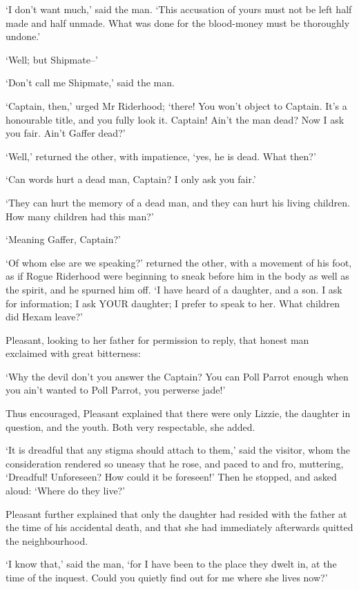 ‘I don’t want much,’ said the man. ‘This accusation of yours must not be
left half made and half unmade. What was done for the blood-money must
be thoroughly undone.’

‘Well; but Shipmate--’

‘Don’t call me Shipmate,’ said the man.

‘Captain, then,’ urged Mr Riderhood; ‘there! You won’t object to
Captain. It’s a honourable title, and you fully look it. Captain! Ain’t
the man dead? Now I ask you fair. Ain’t Gaffer dead?’

‘Well,’ returned the other, with impatience, ‘yes, he is dead. What
then?’

‘Can words hurt a dead man, Captain? I only ask you fair.’

‘They can hurt the memory of a dead man, and they can hurt his living
children. How many children had this man?’

‘Meaning Gaffer, Captain?’

‘Of whom else are we speaking?’ returned the other, with a movement of
his foot, as if Rogue Riderhood were beginning to sneak before him in
the body as well as the spirit, and he spurned him off. ‘I have heard
of a daughter, and a son. I ask for information; I ask YOUR daughter; I
prefer to speak to her. What children did Hexam leave?’

Pleasant, looking to her father for permission to reply, that honest man
exclaimed with great bitterness:

‘Why the devil don’t you answer the Captain? You can Poll Parrot enough
when you ain’t wanted to Poll Parrot, you perwerse jade!’

Thus encouraged, Pleasant explained that there were only Lizzie, the
daughter in question, and the youth. Both very respectable, she added.

‘It is dreadful that any stigma should attach to them,’ said the
visitor, whom the consideration rendered so uneasy that he rose, and
paced to and fro, muttering, ‘Dreadful! Unforeseen? How could it be
foreseen!’ Then he stopped, and asked aloud: ‘Where do they live?’

Pleasant further explained that only the daughter had resided with the
father at the time of his accidental death, and that she had immediately
afterwards quitted the neighbourhood.

‘I know that,’ said the man, ‘for I have been to the place they dwelt
in, at the time of the inquest. Could you quietly find out for me where
she lives now?’

